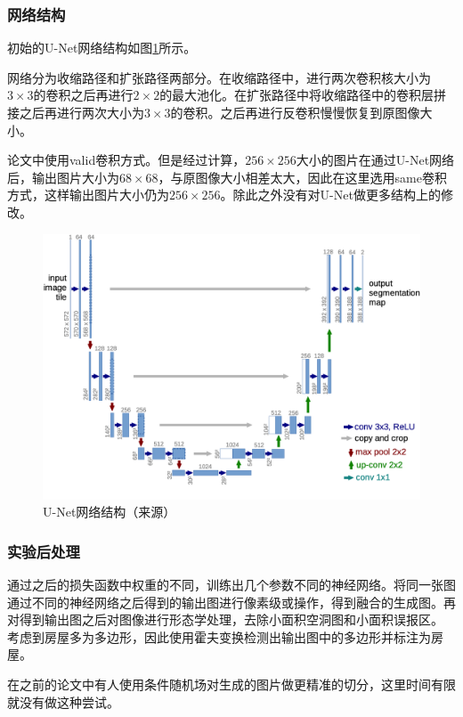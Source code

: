 \subsubsection{网络结构}
初始的U-Net网络结构如图\ref{Fig:unet_construction}所示。

网络分为收缩路径和扩张路径两部分。在收缩路径中，进行两次卷积核大小为$3\times 3$的卷积之后再进行$2\times 2$的最大池化。在扩张路径中将收缩路径中的卷积层拼接之后再进行两次大小为$3\times 3$的卷积。之后再进行反卷积慢慢恢复到原图像大小。

论文\cite{ronneberger2015u}中使用valid卷积方式。但是经过计算，$256\times 256$大小的图片在通过U-Net网络后，输出图片大小为$68\times 68$，与原图像大小相差太大，因此在这里选用same卷积方式，这样输出图片大小仍为$256\times 256$。除此之外没有对U-Net做更多结构上的修改。
\begin{figure}[!t]
    \centering
    \includegraphics[width=1\textwidth]{Figures/unet_construction.png}
    \caption{U-Net网络结构（来源\cite{ronneberger2015u}）}
    \label{Fig:unet_construction}
\end{figure}
\subsubsection{实验后处理}
通过之后的损失函数中权重的不同，训练出几个参数不同的神经网络。将同一张图通过不同的神经网络之后得到的输出图进行像素级或操作，得到融合的生成图。再对得到输出图之后对图像进行形态学处理，去除小面积空洞图和小面积误报区。
考虑到房屋多为多边形，因此使用霍夫变换检测出输出图中的多边形并标注为房屋。

在之前的论文中有人使用条件随机场对生成的图片做更精准的切分，这里时间有限就没有做这种尝试。
